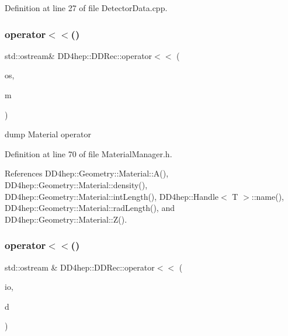 Definition at line 27 of file Detector\+Data.\+cpp.

\hypertarget{namespace_d_d4hep_1_1_d_d_rec_ae8f5d05fd4ac3fcd53bc8f469f9b4ec4}{}\label{namespace_d_d4hep_1_1_d_d_rec_ae8f5d05fd4ac3fcd53bc8f469f9b4ec4} 
\subsubsection{\texorpdfstring{operator$<$$<$()}{operator<<()}\hspace{0.1cm}{\footnotesize\ttfamily [3/7]}}
{\footnotesize\ttfamily std\+::ostream\& D\+D4hep\+::\+D\+D\+Rec\+::operator$<$$<$ (\begin{DoxyParamCaption}\item[{std\+::ostream \&}]{os,  }\item[{const \hyperlink{class_d_d4hep_1_1_geometry_1_1_material}{Material} \&}]{m }\end{DoxyParamCaption})\hspace{0.3cm}{\ttfamily [inline]}}



dump Material operator 



Definition at line 70 of file Material\+Manager.\+h.



References D\+D4hep\+::\+Geometry\+::\+Material\+::\+A(), D\+D4hep\+::\+Geometry\+::\+Material\+::density(), D\+D4hep\+::\+Geometry\+::\+Material\+::int\+Length(), D\+D4hep\+::\+Handle$<$ T $>$\+::name(), D\+D4hep\+::\+Geometry\+::\+Material\+::rad\+Length(), and D\+D4hep\+::\+Geometry\+::\+Material\+::\+Z().

\hypertarget{namespace_d_d4hep_1_1_d_d_rec_abb36ebe6cd2bdcb3a1bf8dd305d70c75}{}\label{namespace_d_d4hep_1_1_d_d_rec_abb36ebe6cd2bdcb3a1bf8dd305d70c75} 
\subsubsection{\texorpdfstring{operator$<$$<$()}{operator<<()}\hspace{0.1cm}{\footnotesize\ttfamily [4/7]}}
{\footnotesize\ttfamily std\+::ostream \& D\+D4hep\+::\+D\+D\+Rec\+::operator$<$$<$ (\begin{DoxyParamCaption}\item[{std\+::ostream \&}]{io,  }\item[{const \hyperlink{namespace_d_d4hep_1_1_d_d_rec_a589fa302569ee79d91b34ff0d97d4a78}{Z\+Disk\+Petals\+Data} \&}]{d }\end{DoxyParamCaption})}



